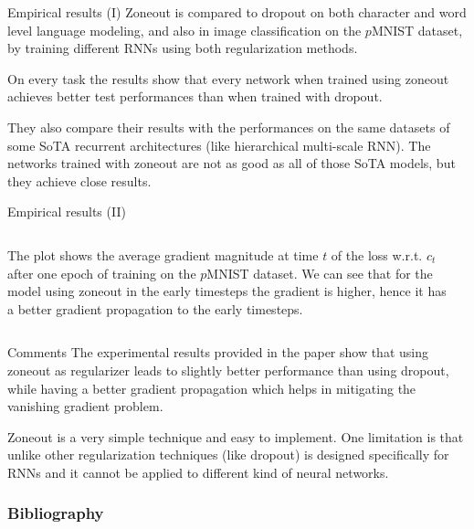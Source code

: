 \documentclass{beamer}
\begin{document}
\begin{frame}{Empirical results (I)}
Zoneout is compared to dropout on both character and word level language modeling, and also in image classification on the $p$MNIST dataset, by training different RNNs using both regularization methods.

\vspace{0.3cm}
On every task the results show that every network when trained using zoneout achieves better test performances than when trained with dropout. 

\vspace{0.3cm}
They also compare their results with the performances on the same datasets of some SoTA recurrent architectures (like hierarchical multi-scale RNN). The networks trained with zoneout are not as good as all of those SoTA models, but they achieve close results.

\end{frame}

\begin{frame}{Empirical results (II)}
  \begin{columns}      
    \begin{column}{.5\textwidth}
    The plot shows the average gradient magnitude at time $t$ of the loss w.r.t. $c_t$ after one epoch of training on the $p$MNIST dataset. We can see that for the model using zoneout in the early timesteps the gradient is higher, hence it has a better gradient propagation to the early timesteps.
    \end{column}
    \begin{column}{.5\textwidth}
    \end{column}
  \end{columns}
\end{frame}

\begin{frame}{Comments}
The experimental results provided in the paper show that using zoneout as regularizer leads to slightly better performance than using dropout, while having a better gradient propagation which helps in mitigating the vanishing gradient problem.

\vspace{0.3cm}
Zoneout is a very simple technique and easy to implement. One limitation is that unlike other regularization techniques (like dropout) is designed specifically for RNNs and it cannot be applied to different kind of neural networks.
\end{frame}	


\begin{frame}
    \frametitle{Bibliography}
    \footnotesize
    \nocite{krueger2016zoneout}
    
    
\end{frame}
	
	
\end{document}
